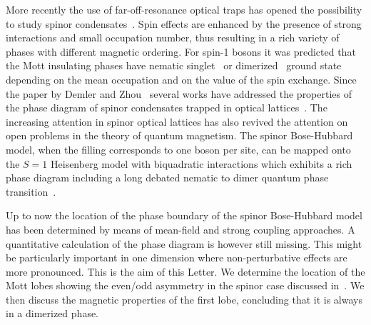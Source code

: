 \documentclass[prl,twocolumn,superscriptaddress,showpacs,floatfix]{revtex4}
\begin{document}
More recently the use of far-off-resonance optical traps has opened the
possibility to study spinor condensates~\cite{stamperkurn00}. Spin effects are 
enhanced by the presence of strong interactions and small occupation number, 
thus resulting in a rich variety of phases with different magnetic 
ordering. For spin-1 bosons it was predicted that the Mott 
insulating phases have nematic singlet~\cite{demler02}
or dimerized~\cite{yip03} ground state depending on the mean occupation
and on the value of the spin exchange. 
Since the paper by Demler and Zhou~\cite{demler02} several works have 
addressed the properties of the phase diagram of spinor condensates trapped in 
optical lattices~\cite{imambekov03,zhou03,duan03,svidzinsky03,imambekov04,snoek04}.
The increasing attention in spinor optical lattices has also 
revived the attention on open problems in the theory of quantum magnetism.
The spinor Bose-Hubbard model, when the filling corresponds to one boson per 
site, can be mapped onto the $S=1$ Heisenberg model with biquadratic
interactions which exhibits a rich phase diagram including
a long debated nematic to dimer quantum phase
transition~\cite{chubukov91,xian93,fath95,kawashima02,tsuchiya04,porras05,lauchli03,garcia-ripoll04}.

Up to now the location of the phase boundary of the spinor Bose-Hubbard model
has been determined by means of mean-field and strong coupling approaches.
A quantitative calculation of the phase diagram is however still missing.
This might be particularly important in one dimension where non-perturbative
effects are more pronounced. This is the aim of this Letter.
We determine the location of the Mott lobes showing the even/odd asymmetry
in the spinor case discussed in~\cite{demler02}.
We then discuss the magnetic properties of the first lobe, concluding that
it is always in a dimerized phase. 
\end{document}
